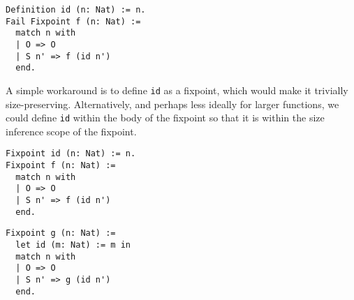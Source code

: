 \begin{comment}
A fixpoint must have at one recursive argument -- that is, in the call to that fixpoint in its body, the size of that argument must decrease.
If the return type has the same type as that argument, and the object returned has the same size as the argument, then the return type would have the same size as the argument type, and the size is preserved.
The argument is similar for cofixpoints: the returned object must have a larger size than that returned by the call to the cofixpoint, and if an argument has the same type and size, then the size is preserved.

Aside from global \cofixpoints, local definitions of functions may be size-preserving as well, since the constraints generated from those local definitions are passed to the size inference algorithm when checking a \cofixpoint.
However, global non-\cofixpoint definitions are always assigned infinite size annotations; otherwise, all functions would have to be considered as possibly size-preserving.
This is particularly challenging, as multivariable functions in Coq are in reality curried single-variable abstractions in \lang.
Furthermore, the benefit of size-preserved functions is to allow termination checking of certain \cofixpoints, such as \texttt{quicksort} above, and there generally is no reason for a function to be size-preserving if it were not a \cofixpoint in the first place.
The consequence of this is that using functions in \cofixpoints where size-preservation is expected leads to failure of type checking, such as in the following example.
\end{comment}

\begin{verbatim}
Definition id (n: Nat) := n.
Fail Fixpoint f (n: Nat) :=
  match n with
  | O => O
  | S n' => f (id n')
  end.
\end{verbatim}

A simple workaround is to define \texttt{id} as a fixpoint, which would make it trivially size-preserving.
Alternatively, and perhaps less ideally for larger functions, we could define \texttt{id} within the body of the fixpoint so that it is within the size inference scope of the fixpoint.
\begin{multicols}{2}
\begin{verbatim}
Fixpoint id (n: Nat) := n.
Fixpoint f (n: Nat) :=
  match n with
  | O => O
  | S n' => f (id n')
  end.
\end{verbatim}
\begin{verbatim}
Fixpoint g (n: Nat) :=
  let id (m: Nat) := m in
  match n with
  | O => O
  | S n' => g (id n')
  end.
\end{verbatim}
\end{multicols}

